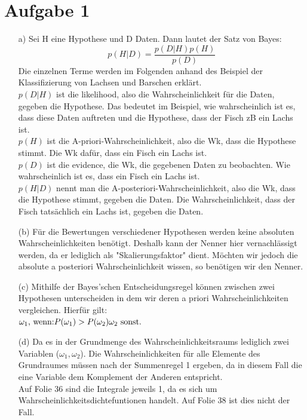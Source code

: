 \documentclass[a4paper]{scrartcl}
\begin{document}
	
\section*{Aufgabe 1}

	\begin{itemize} 
		
	\item[a)] Sei H eine Hypothese und D Daten. Dann lautet der Satz von Bayes: $$p(H|D) = \frac{p(D|H)p(H)}{p(D)}$$
	Die einzelnen Terme werden im Folgenden anhand des Beispiel der Klassifizierung von Lachsen und Barschen erklärt.\\
	$p(D|H)$ ist die likelihood, also die Wahrscheinlichkeit für die Daten, gegeben die Hypothese. Das bedeutet im Beispiel, wie wahrscheinlich ist es, dass diese Daten auftreten und die Hypothese, dass der Fisch zB ein Lachs ist.\\
	$p(H)$ ist die A-priori-Wahrscheinlichkeit, also die Wk, dass die Hypothese stimmt. Die Wk dafür, dass ein Fisch ein Lachs ist.\\
	$p(D)$ ist die evidence, die Wk, die gegebenen Daten zu beobachten. Wie wahrscheinlich ist es, dass ein Fisch ein Lachs ist.\\
	$p(H|D)$ nennt man die A-posteriori-Wahrscheinlichkeit, also die Wk, dass die Hypothese stimmt, gegeben die Daten. Die Wahrscheinlichkeit, dass der Fisch tatsächlich ein Lachs ist, gegeben die Daten.


	\item[(b)] Für die Bewertungen verschiedener Hypothesen werden keine absoluten Wahrscheinlichkeiten benötigt. Deshalb kann der Nenner hier vernachlässigt werden, da er lediglich als "Skalierungsfaktor" dient. Möchten wir jedoch die absolute a posteriori Wahrscheinlichkeit wissen, so benötigen wir den Nenner.



	\item[(c)]
	Mithilfe der Bayes'schen Entscheidungsregel können zwischen zwei Hypothesen unterscheiden in dem wir deren a priori Wahrscheinlichkeiten vergleichen. Hierfür gilt:\\
	$
	\omega_1 \text{, wenn:} P(\omega_1) > P(\omega_2)\\
	\omega_2 \text{ sonst.}
	$



\item[(d)]
	Da es in der Grundmenge des Wahrscheinlichkeitsraums lediglich zwei Variablen ($\omega_1, \omega_2$). Die Wahrscheinlichkeiten für alle Elemente des Grundraumes müssen nach der Summenregel 1 ergeben, da 
	in diesem Fall die eine Variable dem Komplement der Anderen entspricht.
	\\
	Auf Folie 36 sind die Integrale jeweils 1, da es sich um Wahrscheinlichkeitsdichtefuntionen handelt. Auf Folie 38 ist dies nicht der Fall.



\end{itemize}
\end{document}
